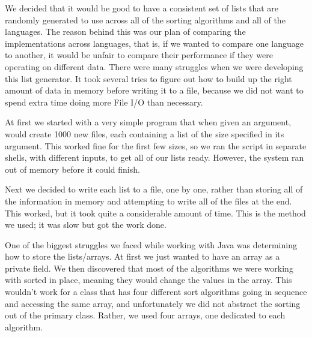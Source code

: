 \documentclass[12pt]{amsart}
\begin{document}
We decided that it would be good to have a consistent set of lists that are 
randomly generated to use across all of the sorting algorithms and all of the 
languages. The reason behind this was our plan of comparing the implementations across languages, that is, if we wanted to compare one language to another, it would be unfair to compare their performance if they were operating on different data. There were many struggles when we were developing this list generator.
It took several tries to figure out how to build up the right amount of data in 
memory before writing it to a file, because we did not want to spend extra time 
doing more File I/O than necessary. 

At first we started with a very simple program that when given an argument, would
create 1000 new files, each containing a list of the size specified in its 
argument. This worked fine for the first few sizes, so we ran the script in 
separate shells, with different inputs, to get all of our lists ready. However,
the system ran out of memory before it could finish.

Next we decided to write each list to a file, one by one, rather than storing all 
of the information in memory and attempting to write all of the files at the end. 
This worked, but it took quite a considerable amount of time. This is the method we used; it was slow but got the work done.

One of the biggest struggles we faced while working with Java was determining how 
to store the lists/arrays. At first we just wanted to have an array as a private 
field. We then discovered that most of the algorithms we were working with sorted 
in place, meaning they would change the values in the array. This wouldn't work 
for a class that has four different sort algorithms going in sequence and
accessing the same array, and unfortunately we did not abstract the sorting out 
of the primary class. Rather, we used four arrays, one dedicated to each 
algorithm.
\end{document}
